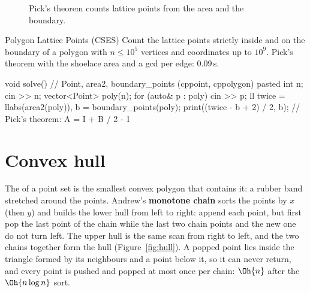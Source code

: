 \begin{figure}[htbp]
\centering
{}
\caption{Pick's theorem counts lattice points from the area and the boundary.}
\label{fig:pick}
\end{figure}

\begin{problem}{Polygon Lattice Points (CSES)}
Count the lattice points strictly inside and on the boundary of a polygon with $n \le 10^5$ vertices and coordinates up to $10^9$.
\solution Pick's theorem with the shoelace area and a gcd per edge: 0.09\,s.
\end{problem}

\begin{code}
void solve() {  // Point, area2, boundary_points (cppoint, cppolygon) pasted
    int n;
    cin >> n;
    vector<Point> poly(n);
    for (auto& p : poly) cin >> p;
    ll twice = llabs(area2(poly)), b = boundary_points(poly);
    print((twice - b + 2) / 2, b);  // Pick's theorem: A = I + B / 2 - 1
}
\end{code}

\section[Convex hull]{Convex hull \hfill \plat}\label{sec:hull}

The  of a point set is the smallest convex polygon that contains it: a rubber band stretched around the points.
Andrew's \textbf{monotone chain} sorts the points by $x$ (then $y$) and builds the lower hull from left to right: append each point, but
first pop the last point of the chain while the last two chain points and the new one do not turn left. The upper hull is the same
scan from right to left, and the two chains together form the hull (Figure~\ref{fig:hull}). A popped point lies inside the triangle formed
by its neighbours and a point below it, so it can never return, and every point is pushed and popped at most once per chain: $\Oh{n}$
after the $\Oh{n \log n}$ sort.


